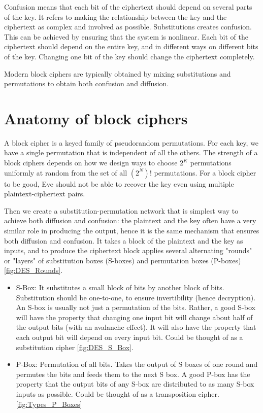 Confusion means that each bit of the ciphertext should depend on several parts of the key. It refers to making the relationship between the key and the ciphertext as complex and involved as possible. Substitutions creates confusion. This can be achieved by ensuring that the system is nonlinear. Each bit of the ciphertext should depend on the entire key, and in different ways on different bits of the key. Changing one bit of the key should change the ciphertext completely.

Modern block ciphers are typically obtained by mixing substitutions and permutations to obtain both confusion and diffusion.

\section{Anatomy of block ciphers}

A block cipher is a keyed family of pseudorandom permutations. For each key, we have a single permutation that is independent of all the others. The strength of a block ciphers depends on how we design ways to choose $2^K$ permutations uniformly at random from the set of all $(2^N)!$ permutations. For a block cipher to be good, Eve should not be able to recover the key even using multiple plaintext-ciphertext pairs.

Then we create a substitution-permutation network that is simplest way to achieve both diffusion and confusion: the plaintext and the key often have a very similar role in producing the output, hence it is the same mechanism that ensures both diffusion and confusion. It takes a block of the plaintext and the key as inputs, and to produce the ciphertext block applies several alternating "rounds" or "layers" of substitution boxes (S-boxes) and permutation boxes (P-boxes) \ref{fig:DES_Rounds}.

\begin{itemize}
	\item S-Box: It substitutes a small block of bits by another block of bits. Substitution should be one-to-one, to ensure invertibility (hence decryption). An S-box is usually not just a permutation of the bits. Rather, a good S-box will have the property that changing one input bit will change about half of the output bits (with an avalanche effect). It will also have the property that each output bit will depend on every input bit. Could be thought of as a substitution cipher \ref{fig:DES_S_Box}. 
	\item P-Box: Permutation of all bits. Takes the output of S boxes of one round and permutes the bits and feeds them to the next S box. A good P-box has the property that the output bits of any S-box are distributed to as many S-box inputs as possible. Could be thought of as a transposition cipher. \ref{fig:Types_P_Boxes}
\end{itemize}

